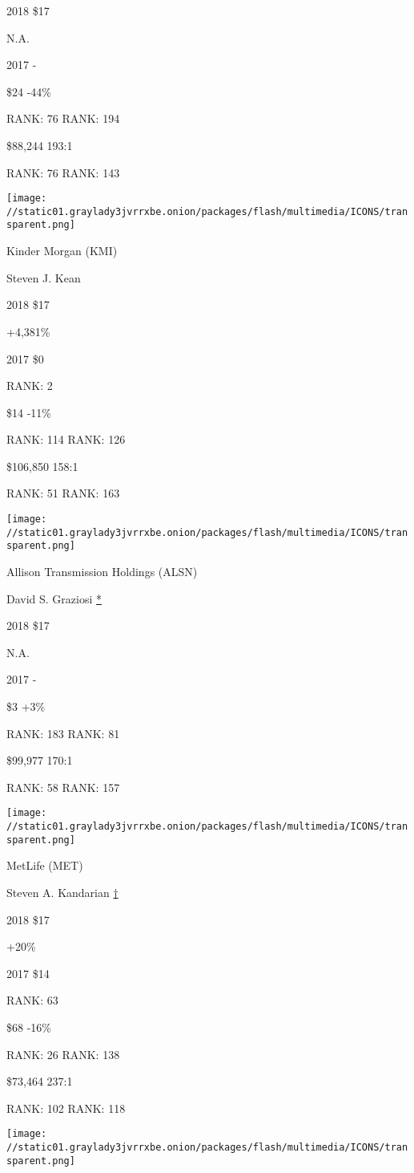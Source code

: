 2018 \$17

 N.A.

2017 -

 \$24 -44\%

RANK: 76 RANK: 194

 \$88,244 193:1

RANK: 76 RANK: 143

\texttt{[image: //static01.graylady3jvrrxbe.onion/packages/flash/multimedia/ICONS/transparent.png]}

Kinder Morgan (KMI)

Steven J. Kean \protect\hyperlink{g-footnotes}{}

2018 \$17

 +4,381\%

2017 \$0

RANK: 2

 \$14 -11\%

RANK: 114 RANK: 126

 \$106,850 158:1

RANK: 51 RANK: 163

\texttt{[image: //static01.graylady3jvrrxbe.onion/packages/flash/multimedia/ICONS/transparent.png]}

Allison Transmission Holdings (ALSN)

David S. Graziosi \protect\hyperlink{g-footnotes}{*}

2018 \$17

 N.A.

2017 -

 \$3 +3\%

RANK: 183 RANK: 81

 \$99,977 170:1

RANK: 58 RANK: 157

\texttt{[image: //static01.graylady3jvrrxbe.onion/packages/flash/multimedia/ICONS/transparent.png]}

MetLife (MET)

Steven A. Kandarian \protect\hyperlink{g-footnotes}{†}

2018 \$17

 +20\%

2017 \$14

RANK: 63

 \$68 -16\%

RANK: 26 RANK: 138

 \$73,464 237:1

RANK: 102 RANK: 118

\texttt{[image: //static01.graylady3jvrrxbe.onion/packages/flash/multimedia/ICONS/transparent.png]}

